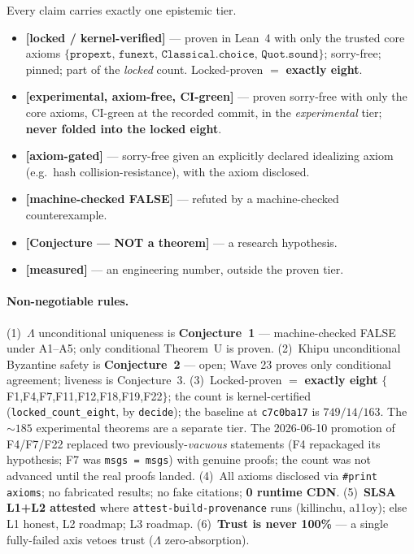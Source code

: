 \documentclass[11pt,letterpaper]{article}
\theoremstyle{definition}
\newcommand{\Lam}{\Lambda}
\newcommand{\kernelaxioms}{\{\texttt{propext},\,\texttt{funext},\,\texttt{Classical.choice},\,\texttt{Quot.sound}\}}
\begin{document}
Every claim carries exactly one epistemic tier.
\begin{itemize}
\item \textbf{[locked / kernel-verified]} --- proven in Lean~4 with only the
trusted core axioms $\kernelaxioms$; sorry-free; pinned; part of the
\emph{locked} count. Locked-proven $=$ \textbf{exactly eight}.
\item \textbf{[experimental, axiom-free, CI-green]} --- proven sorry-free with
only the core axioms, CI-green at the recorded commit, in the \emph{experimental}
tier; \textbf{never folded into the locked eight}.
\item \textbf{[axiom-gated]} --- sorry-free given an explicitly declared
idealizing axiom (e.g.\ hash collision-resistance), with the axiom disclosed.
\item \textbf{[machine-checked FALSE]} --- refuted by a machine-checked
counterexample.
\item \textbf{[Conjecture --- NOT a theorem]} --- a research hypothesis.
\item \textbf{[measured]} --- an engineering number, outside the proven tier.
\end{itemize}

\paragraph{Non-negotiable rules.}
(1)~$\Lam$ unconditional uniqueness is \textbf{Conjecture~1} --- machine-checked
FALSE under A1--A5; only conditional Theorem~U is proven.
(2)~Khipu unconditional Byzantine safety is \textbf{Conjecture~2} --- open; Wave
23 proves only conditional agreement; liveness is Conjecture~3.
(3)~Locked-proven $=$ \textbf{exactly eight}
$\{$F1,F4,F7,F11,F12,F18,F19,F22$\}$; the count is kernel-certified
(\texttt{locked\_count\_eight}, by \texttt{decide}); the baseline at
\texttt{c7c0ba17} is $749/14/163$. The $\sim 185$ experimental theorems are a
separate tier. The 2026-06-10 promotion of F4/F7/F22 replaced two
previously-\emph{vacuous} statements (F4 repackaged its hypothesis; F7 was
\texttt{msgs = msgs}) with genuine proofs; the count was not advanced until the
real proofs landed.
(4)~All axioms disclosed via \texttt{\#print axioms}; no fabricated results; no
fake citations; \textbf{0 runtime CDN}.
(5)~\textbf{SLSA L1+L2 attested} where \texttt{attest-build-provenance} runs
(killinchu, a11oy); else L1 honest, L2 roadmap; L3 roadmap.
(6)~\textbf{Trust is never 100\%} --- a single fully-failed axis vetoes trust
($\Lam$ zero-absorption).
\end{document}
